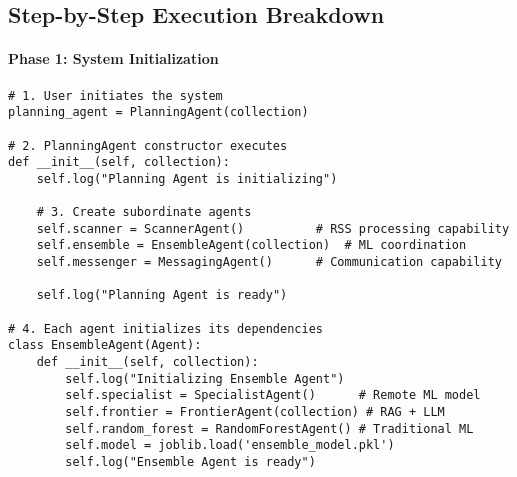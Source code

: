 \subsection{Step-by-Step Execution Breakdown}

\paragraph{Phase 1: System Initialization}
\begin{lstlisting}[caption=System Startup Sequence]
# 1. User initiates the system
planning_agent = PlanningAgent(collection)

# 2. PlanningAgent constructor executes
def __init__(self, collection):
    self.log("Planning Agent is initializing")
    
    # 3. Create subordinate agents
    self.scanner = ScannerAgent()          # RSS processing capability
    self.ensemble = EnsembleAgent(collection)  # ML coordination
    self.messenger = MessagingAgent()      # Communication capability
    
    self.log("Planning Agent is ready")

# 4. Each agent initializes its dependencies
class EnsembleAgent(Agent):
    def __init__(self, collection):
        self.log("Initializing Ensemble Agent")
        self.specialist = SpecialistAgent()      # Remote ML model
        self.frontier = FrontierAgent(collection) # RAG + LLM
        self.random_forest = RandomForestAgent() # Traditional ML
        self.model = joblib.load('ensemble_model.pkl')
        self.log("Ensemble Agent is ready")
\end{lstlisting}

